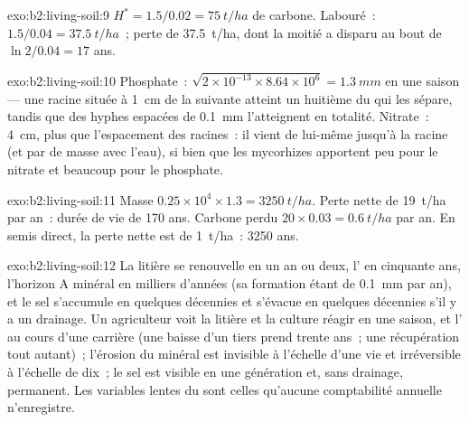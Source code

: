\begin{solution}{exo:b2:living-soil:9}
$H^{*} = 1.5/0.02 = \qty{75}{t/ha}$ de carbone. Labouré~: $1.5/0.04
= \qty{37.5}{t/ha}$~; perte de \qty{37.5}{t/ha}, dont la moitié a
disparu au bout de $\ln 2/0.04 = 17$ ans.
\end{solution}

\begin{solution}{exo:b2:living-soil:10}
Phosphate~: $\sqrt{2\times 10^{-13}\times 8.64\times 10^{6}} =
\qty{1.3}{mm}$ en une saison --- une racine située à \qty{1}{cm} de la
suivante atteint un huitième du  qui les sépare, tandis que des hyphes
espacées de \qty{0.1}{mm} l'atteignent en totalité. Nitrate~: \qty{4}{cm},
plus que l'espacement des racines~: il vient de lui-même jusqu'à la racine
(et par  de masse avec l'eau), si bien que les mycorhizes apportent
peu pour le nitrate et beaucoup pour le phosphate.
\end{solution}

\begin{solution}{exo:b2:living-soil:11}
Masse $0.25\times 10^{4}\times 1.3 = \qty{3250}{t/ha}$. Perte nette de
\qty{19}{t/ha} par an~: durée de vie de 170 ans. Carbone perdu $20\times
0.03 = \qty{0.6}{t/ha}$ par an. En semis direct, la perte nette est de
\qty{1}{t/ha}~: 3250 ans.
\end{solution}

\begin{solution}{exo:b2:living-soil:12}
La litière se renouvelle en un an ou deux, l' en cinquante ans,
l'horizon A minéral en milliers d'années (sa formation étant de
\qty{0.1}{mm} par an), et le sel s'accumule en quelques décennies et
s'évacue en quelques décennies s'il y a un drainage. Un agriculteur voit
la litière et la culture réagir en une saison, et l' au cours d'une
carrière (une baisse d'un tiers prend trente ans~; une récupération tout
autant)~; l'érosion du  minéral est invisible à l'échelle d'une vie et
irréversible à l'échelle de dix~; le sel est visible en une génération et,
sans drainage, permanent. Les variables lentes du  sont celles
qu'aucune comptabilité annuelle n'enregistre.
\end{solution}

